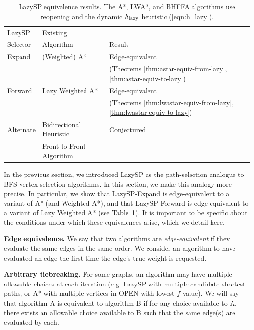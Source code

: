 \documentclass[nobib]{tufte-book}
\newcommand{\ms}[1]{\mbox{\scriptsize #1}}
\begin{document}
\begin{table}
   \centering
   {\small%
   \begin{tabular}{lll}
      \toprule
      LazySP & Existing & \\
      Selector & Algorithm & Result \\
      \midrule
      Expand & (Weighted) A* & Edge-equivalent \\
      & & (Theorems \ref{thm:astar-equiv-from-lazy},
                 \ref{thm:astar-equiv-to-lazy}) \\
      \addlinespace[0.3em]
      Forward & Lazy Weighted A* & Edge-equivalent \\
      & & (Theorems \ref{thm:lwastar-equiv-from-lazy},
                 \ref{thm:lwastar-equiv-to-lazy}) \\
      \addlinespace[0.3em]
      Alternate & Bidirectional Heuristic & Conjectured \\
      & Front-to-Front Algorithm & \\
      \bottomrule
   \end{tabular}%
   }%
   \caption{LazySP equivalence results.
      The A*, LWA*, and BHFFA algorithms use reopening and the dynamic
      $h_{\ms{lazy}}$ heuristic (\ref{eqn:h_lazy}).}
   \label{table:equivalences}
\end{table}

In the previous section,
we introduced LazySP as the path-selection analogue
to BFS vertex-selection algorithms.
In this section,
we make this analogy more precise.
In particular,
we show that LazySP-Expand
is edge-equivalent to a variant of A*
(and Weighted A*),
and that LazySP-Forward is edge-equivalent to a variant of
Lazy Weighted A*
(see Table~\ref{table:equivalences}).
It is important to be specific about the conditions under which
these equivalences arise,
which we detail here.

\textbf{Edge equivalence.}
We say that two algorithms are \emph{edge-equivalent} if they
evaluate the same edges in the same order.
We consider an algorithm to have evaluated an edge
the first time the edge's true weight is requested.

\textbf{Arbitrary tiebreaking.}
For some graphs,
an algorithm may have multiple allowable choices at each iteration
(e.g. LazySP with multiple candidate shortest paths,
or A* with multiple vertices in OPEN with lowest $f$-value).
We will say that algorithm A is equivalent to algorithm B
if for any choice available to A,
there exists an allowable choice available to B
such that the same edge(s) are evaluated by each.
\end{document}
